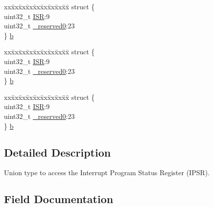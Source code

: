 \begin{DoxyCompactItemize}
\begin{tabbing}
\end{tabbing}\item 
\begin{tabbing}
xx\=xx\=xx\=xx\=xx\=xx\=xx\=xx\=xx\=\kill
struct \{\\
\>uint32\_t \mbox{\hyperlink{union_i_p_s_r___type_ad502ba7dbb2aab5f87c782b28f02622d}{ISR}}:9\\
\>uint32\_t \mbox{\hyperlink{union_i_p_s_r___type_ac8a6a13838a897c8d0b8bc991bbaf7c1}{\_reserved0}}:23\\
\} \mbox{\hyperlink{union_i_p_s_r___type_a9da38bc566a366ab30cb221935ab2c46}{b}}\\

\end{tabbing}\item 
\begin{tabbing}
xx\=xx\=xx\=xx\=xx\=xx\=xx\=xx\=xx\=\kill
struct \{\\
\>uint32\_t \mbox{\hyperlink{union_i_p_s_r___type_ad502ba7dbb2aab5f87c782b28f02622d}{ISR}}:9\\
\>uint32\_t \mbox{\hyperlink{union_i_p_s_r___type_ac8a6a13838a897c8d0b8bc991bbaf7c1}{\_reserved0}}:23\\
\} \mbox{\hyperlink{union_i_p_s_r___type_a77bc2e3569776643bbcd77a7b2bc69c3}{b}}\\

\end{tabbing}\item 
\begin{tabbing}
xx\=xx\=xx\=xx\=xx\=xx\=xx\=xx\=xx\=\kill
struct \{\\
\>uint32\_t \mbox{\hyperlink{union_i_p_s_r___type_ad502ba7dbb2aab5f87c782b28f02622d}{ISR}}:9\\
\>uint32\_t \mbox{\hyperlink{union_i_p_s_r___type_ac8a6a13838a897c8d0b8bc991bbaf7c1}{\_reserved0}}:23\\
\} \mbox{\hyperlink{union_i_p_s_r___type_ac084c51939b6ba8158a34b784e88a14b}{b}}\\

\end{tabbing}\end{DoxyCompactItemize}


\subsection{Detailed Description}
Union type to access the Interrupt Program Status Register (I\+P\+SR). 

\subsection{Field Documentation}
\mbox{\label{union_i_p_s_r___type_ac8a6a13838a897c8d0b8bc991bbaf7c1}} 
